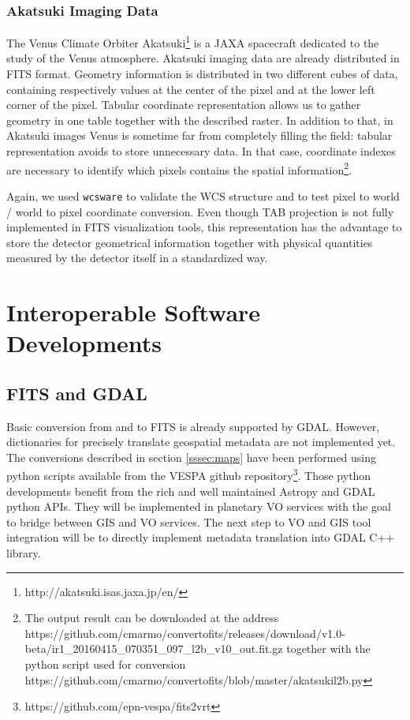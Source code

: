 \subsubsection{Akatsuki Imaging Data}
The Venus Climate Orbiter Akatsuki\footnote{http://akatsuki.isas.jaxa.jp/en/} is a JAXA
spacecraft dedicated to the study of the Venus atmosphere.
Akatsuki imaging data are already distributed in FITS format.
Geometry information is distributed in two different cubes of data, containing
respectively values at the center of the pixel and at the lower left corner of the
pixel.
Tabular coordinate representation allows us to gather geometry in one table together
with the described raster.
In addition to that, in Akatsuki images Venus is sometime far from completely filling
the field: tabular representation avoids to store unnecessary data. 
In that case, coordinate indexes are necessary to identify which pixels contains the
spatial information\footnote{The output result can be downloaded at the address https://github.com/cmarmo/convertofits/releases/download/v1.0-beta/ir1\_20160415\_070351\_097\_l2b\_v10\_out.fit.gz together with the python script used for conversion https://github.com/cmarmo/convertofits/blob/master/akatsukil2b.py}.

Again, we used \texttt{wcsware} to validate the WCS structure and to test pixel to
world / world to pixel coordinate conversion.
Even though TAB projection is not fully implemented in FITS visualization tools,
this representation has the advantage to store the detector geometrical information
together with physical quantities measured by the detector itself in a standardized way.

\section{Interoperable Software Developments}
\label{sec:softdev}

\subsection{FITS and GDAL}
Basic conversion from and to FITS is already supported by GDAL.
However, dictionaries for precisely translate geospatial metadata are not implemented
yet.
The conversions described in section \ref{sssec:maps} have been performed using python
scripts available from the VESPA github repository\footnote{https://github.com/epn-vespa/fits2vrt}.
Those python developments benefit from the rich and well maintained Astropy and GDAL
python APIs.
They will be implemented in planetary VO services with the goal to bridge between GIS 
and VO services.
The next step to VO and GIS tool integration will be to directly implement metadata 
translation into GDAL C++ library. 

